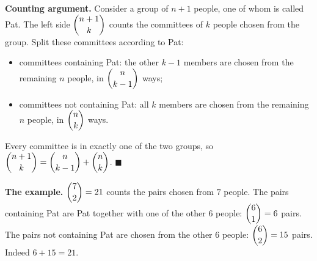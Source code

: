 \textbf{Counting argument.} Consider a group of $n+1$ people, one of whom is called Pat. The left side $\dbinom{n+1}{k}$ counts the committees of $k$ people chosen from the group. Split these committees according to Pat:
\begin{itemize}
\item committees containing Pat: the other $k-1$ members are chosen from the remaining $n$ people, in $\dbinom{n}{k-1}$ ways;
\item committees not containing Pat: all $k$ members are chosen from the remaining $n$ people, in $\dbinom{n}{k}$ ways.
\end{itemize}
Every committee is in exactly one of the two groups, so $\dbinom{n+1}{k}=\dbinom{n}{k-1}+\dbinom nk$. $\blacksquare$

\textbf{The example.} $\dbinom72=21$ counts the pairs chosen from $7$ people. The pairs containing Pat are Pat together with one of the other $6$ people: $\dbinom61=6$ pairs. The pairs not containing Pat are chosen from the other $6$ people: $\dbinom62=15$ pairs. Indeed $6+15=21$.
